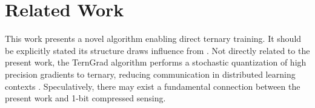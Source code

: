 \documentclass{article}
\begin{document}
\section{Related Work}
This work presents a novel algorithm enabling direct ternary training. It should be explicitly stated its structure draws influence from \cite{baydin2022gradientsbackpropagation}.
Not directly related to the present work, the TernGrad algorithm performs a stochastic quantization of high precision gradients to ternary, reducing communication in distributed learning contexts \cite{DBLP:journals/corr/WenXYWWCL17}.
Speculatively, there may exist a fundamental connection between the present work and 1-bit compressed sensing.



\end{document}
